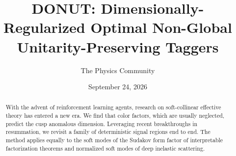 \documentclass[11pt]{article}
\title{DONUT: Dimensionally-Regularized Optimal Non-Global Unitarity-Preserving Taggers}
\author{The Physics Community}
\date{September 24, 2026}
\numberwithin{equation}{section}
\theoremstyle{definition}
\theoremstyle{remark}
\begin{document}
\maketitle
\begin{abstract}
With the advent of reinforcement learning agents, research on
soft-collinear effective theory has entered a new era. We find that
color factors, which are usually neglected, predict the cusp anomalous
dimension. Leveraging recent breakthroughs in resummation, we revisit a
family of deterministic signal regions end to end. The method applies
equally to the soft modes of the Sudakov form factor of interpretable
factorization theorems and normalized soft modes of deep inelastic
scattering.
\end{abstract}
\tableofcontents



\nocite{*}


\end{document}
